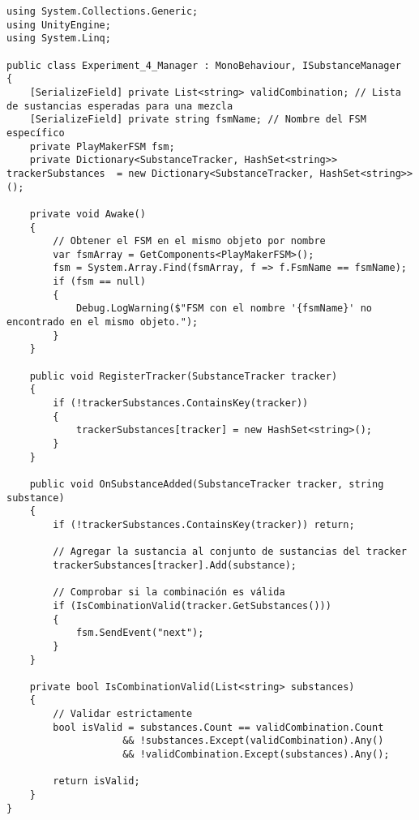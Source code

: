 \begin{verbatim}
using System.Collections.Generic;
using UnityEngine;
using System.Linq;

public class Experiment_4_Manager : MonoBehaviour, ISubstanceManager
{
    [SerializeField] private List<string> validCombination; // Lista de sustancias esperadas para una mezcla
    [SerializeField] private string fsmName; // Nombre del FSM específico
    private PlayMakerFSM fsm;
    private Dictionary<SubstanceTracker, HashSet<string>> trackerSubstances  = new Dictionary<SubstanceTracker, HashSet<string>>();

    private void Awake() 
    {
        // Obtener el FSM en el mismo objeto por nombre
        var fsmArray = GetComponents<PlayMakerFSM>();
        fsm = System.Array.Find(fsmArray, f => f.FsmName == fsmName);
        if (fsm == null)
        {
            Debug.LogWarning($"FSM con el nombre '{fsmName}' no encontrado en el mismo objeto.");
        }
    }

    public void RegisterTracker(SubstanceTracker tracker)
    {
        if (!trackerSubstances.ContainsKey(tracker))
        {
            trackerSubstances[tracker] = new HashSet<string>();
        }
    }

    public void OnSubstanceAdded(SubstanceTracker tracker, string substance)
    {
        if (!trackerSubstances.ContainsKey(tracker)) return;

        // Agregar la sustancia al conjunto de sustancias del tracker
        trackerSubstances[tracker].Add(substance);

        // Comprobar si la combinación es válida
        if (IsCombinationValid(tracker.GetSubstances()))
        {
            fsm.SendEvent("next");
        }
    }

    private bool IsCombinationValid(List<string> substances)
    {
        // Validar estrictamente
        bool isValid = substances.Count == validCombination.Count 
                    && !substances.Except(validCombination).Any() 
                    && !validCombination.Except(substances).Any();

        return isValid;
    }
}
\end{verbatim}
